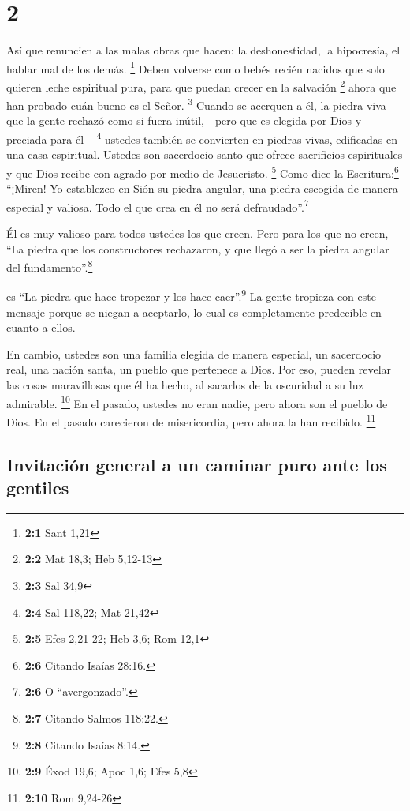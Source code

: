 \hypertarget{section-1}{%
\section{2}\label{section-1}}

 Así que renuncien a las malas obras que hacen: la
deshonestidad, la hipocresía, el hablar mal de los demás. \footnote{\textbf{2:1}
  Sant 1,21}  Deben volverse como bebés recién nacidos que
solo quieren leche espiritual pura, para que puedan crecer en la
salvación \footnote{\textbf{2:2} Mat 18,3; Heb 5,12-13} 
ahora que han probado cuán bueno es el Señor. \footnote{\textbf{2:3} Sal
  34,9}  Cuando se acerquen a él, la piedra viva que la
gente rechazó como si fuera inútil, - pero que es elegida por Dios y
preciada para él -- \footnote{\textbf{2:4} Sal 118,22; Mat 21,42}
 ustedes también se convierten en piedras vivas,
edificadas en una casa espiritual. Ustedes son sacerdocio santo que
ofrece sacrificios espirituales y que Dios recibe con agrado por medio
de Jesucristo. \footnote{\textbf{2:5} Efes 2,21-22; Heb 3,6; Rom 12,1}
 Como dice la Escritura:\footnote{\textbf{2:6} Citando
  Isaías 28:16.} ``¡Miren! Yo establezco en Sión su piedra angular, una
piedra escogida de manera especial y valiosa. Todo el que crea en él no
será defraudado''.\footnote{\textbf{2:6} O ``avergonzado''.}

 Él es muy valioso para todos ustedes los que creen. Pero
para los que no creen, ``La piedra que los constructores rechazaron, y
que llegó a ser la piedra angular del fundamento''.\footnote{\textbf{2:7}
  Citando Salmos 118:22.}

 es ``La piedra que hace tropezar y los hace
caer''.\footnote{\textbf{2:8} Citando Isaías 8:14.} La gente tropieza
con este mensaje porque se niegan a aceptarlo, lo cual es completamente
predecible en cuanto a ellos.

 En cambio, ustedes son una familia elegida de manera
especial, un sacerdocio real, una nación santa, un pueblo que pertenece
a Dios. Por eso, pueden revelar las cosas maravillosas que él ha hecho,
al sacarlos de la oscuridad a su luz admirable. \footnote{\textbf{2:9}
  Éxod 19,6; Apoc 1,6; Efes 5,8}  En el pasado, ustedes
no eran nadie, pero ahora son el pueblo de Dios. En el pasado carecieron
de misericordia, pero ahora la han recibido. \footnote{\textbf{2:10} Rom
  9,24-26}

\hypertarget{invitaciuxf3n-general-a-un-caminar-puro-ante-los-gentiles}{%
\subsection{Invitación general a un caminar puro ante los
gentiles}\label{invitaciuxf3n-general-a-un-caminar-puro-ante-los-gentiles}}

